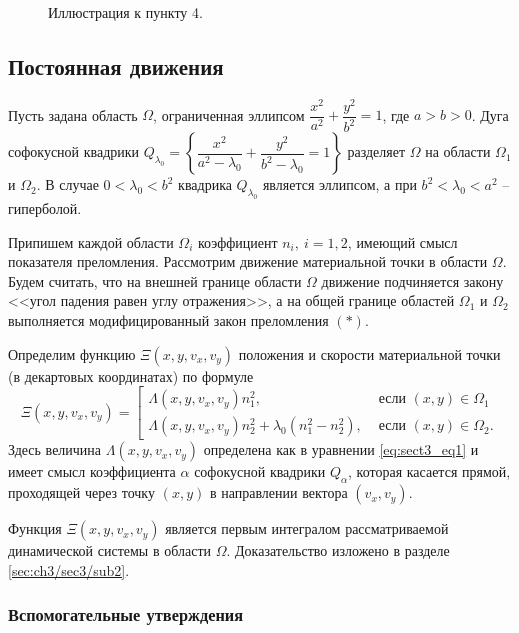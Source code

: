 \begin{figure}[!htb]
    \caption{Иллюстрация к пункту 4.}
    \label{fig:pt8:_example3}
\endminipage\hfill
\end{figure}

\subsection{Постоянная движения}\label{sec:ch3/sec3}
Пусть задана область $\Omega$, ограниченная эллипсом 
$\dfrac{x^2}{a^2} + \dfrac{y^2}{b^2} = 1$, где $a > b > 0$.
Дуга софокусной квадрики $Q_{\lambda_0} = \left\{ \dfrac{x^2}{a^2-\lambda_0} + \dfrac{y^2}{b^2-\lambda_0} = 1 \right\}$ разделяет  $\Omega$ на области $\Omega_1$ и $\Omega_2$.
В случае $0 < \lambda_0 < b^2$ квадрика $Q_{\lambda_0}$ является эллипсом, а при $b^2 < \lambda_0 < a^2$ -- гиперболой.

Припишем каждой области $\Omega_i$  коэффициент $n_i,\  i=1,2$, имеющий смысл показателя преломления. 
Рассмотрим движение материальной точки в области $\Omega$. Будем считать, что на внешней границе области $\Omega$ движение подчиняется закону <<угол падения равен углу отражения>>, 
а на общей границе областей $\Omega_1$ и $\Omega_2$ выполняется модифицированный закон преломления $(\ast)$.

Определим функцию $\Xi(x, y, v_x, v_y)$ положения и скорости материальной точки (в декартовых координатах) по формуле
\begin{equation}
\Xi(x, y, v_x, v_y) = \left[
\begin{array}{ll}
    \Lambda(x, y, v_x, v_y) n_1^2, &  \text{ если } (x,y) \in \Omega_1 \\
    \Lambda(x, y, v_x, v_y) n_2^2 + \lambda_0 (n_1^2-n_2^2), & \text{ если } (x,y) \in \Omega_2    .
\end{array}
\right.
\label{eq:xi_integral_definition}
\end{equation}
Здесь величина $\Lambda(x, y, v_x, v_y)$ определена как в уравнении \eqref{eq:sect3_eq1} и имеет смысл коэффициента $\alpha$  софокусной квадрики $Q_\alpha$, которая касается прямой, проходящей через точку $(x,y)$ в направлении вектора $(v_x, v_y)$.

Функция $\Xi(x, y, v_x, v_y)$ является первым интегралом рассматриваемой динамической системы в области $\Omega$.
Доказательство изложено в разделе \ref{sec:ch3/sec3/sub2}.

\subsubsection{Вспомогательные утверждения}\label{sec:ch3/sec3/sub1}

